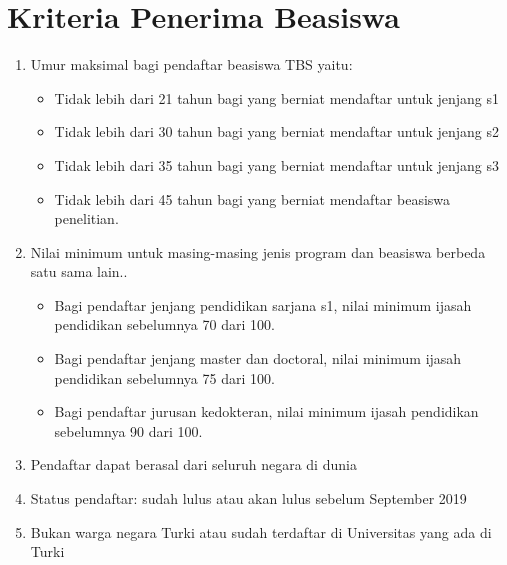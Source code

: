 \section{Kriteria Penerima Beasiswa}

\begin{enumerate}
\item Umur maksimal bagi pendaftar beasiswa TBS yaitu:
\begin{itemize}
\item Tidak lebih dari 21 tahun bagi yang berniat mendaftar untuk jenjang s1
\item Tidak lebih dari 30 tahun bagi yang berniat mendaftar untuk jenjang s2
\item Tidak lebih dari 35 tahun bagi yang berniat mendaftar untuk jenjang s3
\item Tidak lebih dari 45 tahun bagi yang berniat mendaftar beasiswa penelitian.
\end{itemize}
\item Nilai minimum untuk masing-masing jenis program dan beasiswa berbeda satu sama lain..
\begin{itemize}
\item Bagi pendaftar jenjang pendidikan sarjana s1, nilai minimum ijasah pendidikan sebelumnya 70 dari 100.
\item Bagi pendaftar jenjang master dan doctoral, nilai minimum ijasah pendidikan sebelumnya 75 dari 100.
\item Bagi pendaftar jurusan kedokteran, nilai minimum ijasah pendidikan sebelumnya 90 dari 100.
\end{itemize}
\item Pendaftar dapat berasal dari seluruh negara di dunia
\item Status pendaftar: sudah lulus atau akan lulus sebelum September 2019
\item Bukan warga negara Turki atau sudah terdaftar di Universitas yang ada di Turki
\end{enumerate}

